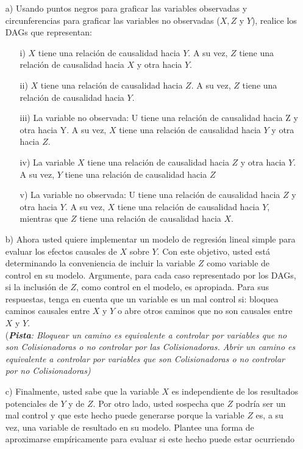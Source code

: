 \documentclass[a4paper]{article}
\begin{document}
\begin{itemize}

\item[a)] Usando puntos negros para graficar las variables observadas y circunferencias para graficar las variables no observadas ($X, Z$ y $Y$), realice los DAGs que representan:



\begin{itemize}
    \item[i)] $X$ tiene una relación de causalidad hacia $Y$. A su vez, $Z$ tiene una relación de causalidad hacia $X$ y otra hacia $Y$.
    
    \item[ii)] $X$ tiene una relación de causalidad hacia $Z$. A su vez, $Z$ tiene una relación de causalidad hacia $Y$.
    
    \item[iii)] La variable no observada: U tiene una relación de causalidad hacia Z y otra hacia Y. A su vez, $X$ tiene una relación de causalidad hacia $Y$ y otra hacia $Z$.
    
    \item[iv)] La variable $X$ tiene una relación de causalidad hacia $Z$ y otra hacia $Y$. A su vez, $Y$ tiene una relación de causalidad hacia $Z$
    
    \item[v)] La variable no observada: U tiene una relación de causalidad hacia $Z$ y otra hacia $Y$. A su vez, $X$ tiene una relación de causalidad hacia $Y$, mientras que $Z$ tiene una relación de causalidad hacia $X$.
    
\end{itemize}


\item[b)] Ahora usted quiere implementar un modelo de regresión lineal simple para evaluar los efectos causales de $X$ sobre $Y$. Con este objetivo, usted está determinando la conveniencia de incluir la variable $Z$ como variable de control en su modelo. Argumente, para cada caso representado por los DAGs, si la inclusión de $Z$, como control en el modelo, es apropiada. Para sus respuestas, tenga en cuenta que un variable es un mal control si: bloquea caminos causales entre $X$ y $Y$ o abre otros caminos que no son causales entre $X$ y $Y$. \\


(\textbf{\textit{Pista}}\textit{: Bloquear un camino es equivalente a controlar por variables que no son Colisionadoras o no controlar por las Colisionadoras. Abrir un camino es equivalente a controlar por variables que son Colisionadoras o no controlar por no Colisionadoras)}




\item[c)] Finalmente, usted sabe que la variable $X$ es independiente de los resultados potenciales de $Y$ y de $Z$. Por otro lado, usted sospecha que $Z$ podría ser un mal control y que este hecho puede generarse porque la variable $Z$ es, a su vez, una variable de resultado en su modelo. Plantee una forma de aproximarse empíricamente para evaluar si este hecho puede estar ocurriendo


\end{itemize}

\bigskip

\end{document}
